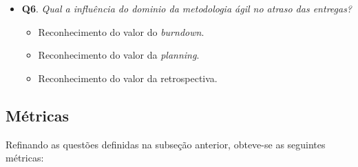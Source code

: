 \begin{itemize}
	 \item \textbf{Q6}. \textit{Qual a influência do dominio da metodologia ágil no atraso das entregas?}
	 	\begin{itemize}
			\item Reconhecimento do valor do \textit{burndown}.
			\item Reconhecimento do valor da \textit{planning}.
			\item Reconhecimento do valor da retrospectiva.
		\end{itemize}
	 
	\end{itemize}

      
      \subsection{Métricas}
	
	Refinando as questões definidas na subseção anterior, obteve-se as seguintes métricas:
	      
